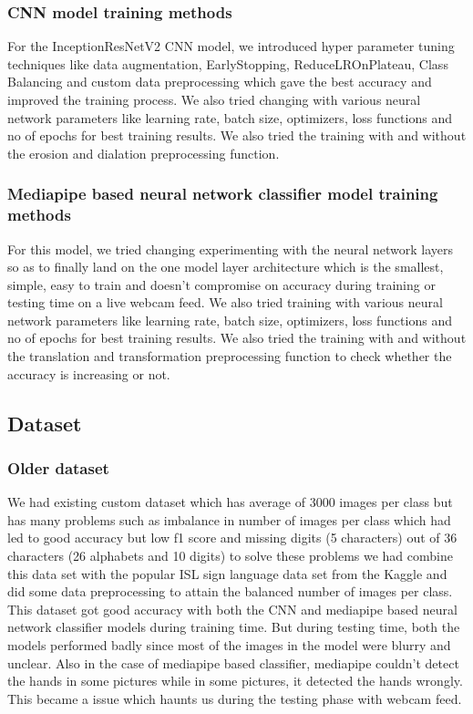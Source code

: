 \documentclass[12pt,a4paper]{report}
\begin{document}
\subsubsection{CNN model training methods}
For the InceptionResNetV2 CNN model, we introduced hyper parameter tuning techniques like data augmentation, EarlyStopping, ReduceLROnPlateau, Class Balancing and custom data preprocessing which gave the best accuracy and improved the training process. We also tried changing with various neural network parameters like learning rate, batch size, optimizers, loss functions and no of epochs for best training results. We also tried the training with and without the erosion and dialation preprocessing function.

\subsubsection{Mediapipe based neural network classifier model training methods}
For this model, we tried changing experimenting with the neural network layers so as to finally land on the one model layer architecture which is the smallest, simple, easy to train and doesn't compromise on accuracy during training or testing time on a live webcam feed. We also tried training with various neural network parameters like learning rate, batch size, optimizers, loss functions and no of epochs for best training results. We also tried the training with and without the translation and transformation preprocessing function to check whether the accuracy is increasing or not.

\subsection{Dataset}

\subsubsection{Older dataset}
We had existing custom dataset which has average of 3000 images per class but has many problems such as imbalance in number of images per class which had led to good accuracy but low f1 score and missing digits (5 characters) out of 36 characters (26 alphabets and 10 digits) to solve these problems we had combine this data set with the popular ISL sign language data set from the Kaggle and did some data preprocessing to attain the balanced number of images per class. This dataset got good accuracy with both the CNN and mediapipe based neural network classifier models during training time. But during testing time, both the models performed badly since most of the images in the model were blurry and unclear. Also in the case of mediapipe based classifier, mediapipe couldn't detect the hands in some pictures while in some pictures, it detected the hands wrongly. This became a issue which haunts us during the testing phase with webcam feed.
\end{document}
